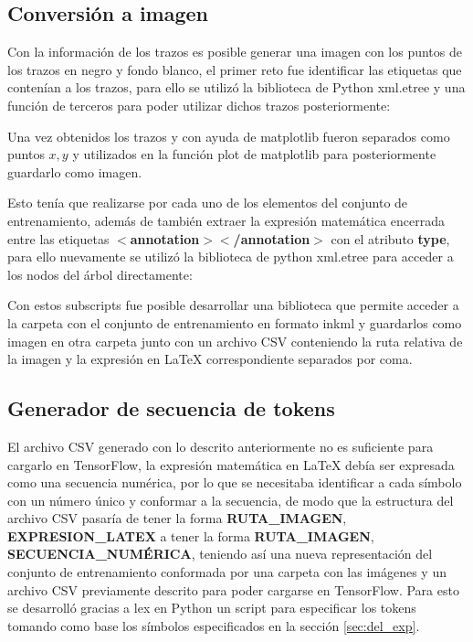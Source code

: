 \subsection{Conversión a imagen}
Con la información de los trazos es posible generar una imagen con los puntos de los trazos en negro y fondo blanco, el primer reto fue identificar las etiquetas que contenían a los trazos, para ello se utilizó la biblioteca de Python xml.etree y una función de terceros para poder utilizar dichos trazos posteriormente:



Una vez obtenidos los trazos y con ayuda de matplotlib fueron separados como puntos $x,y$ y utilizados en la función plot de matplotlib para posteriormente guardarlo como imagen.



Esto tenía que realizarse por cada uno de los elementos del conjunto de entrenamiento, además de también extraer la expresión matemática encerrada entre las etiquetas \textbf{$<$annotation$><$/annotation$>$} con el atributo \textbf{type}, para ello nuevamente se utilizó la biblioteca de python xml.etree para acceder a los nodos del árbol directamente:

Con estos subscripts fue posible desarrollar una biblioteca que permite acceder a la carpeta con el conjunto de entrenamiento en formato inkml y guardarlos como imagen en otra carpeta junto con un archivo CSV conteniendo la ruta relativa de la imagen y la expresión en \LaTeX{} correspondiente separados por coma.


\subsection{Generador de secuencia de tokens}
El archivo CSV generado con lo descrito anteriormente no es suficiente para cargarlo en TensorFlow, la expresión matemática en \LaTeX{} debía ser expresada como una secuencia numérica, por lo que se necesitaba identificar a cada símbolo con un número único y conformar a la secuencia, de modo que la estructura del archivo CSV pasaría de tener la forma \textbf{RUTA\_IMAGEN}, \textbf{EXPRESION\_LATEX} a tener la forma \textbf{RUTA\_IMAGEN}, \textbf{SECUENCIA\_NUMÉRICA}, teniendo así una nueva representación del conjunto de entrenamiento conformada por una carpeta con las imágenes y un archivo CSV previamente descrito para poder cargarse en TensorFlow.
\newpage
Para esto se desarrolló gracias a lex en Python un script para especificar los tokens tomando como base los símbolos especificados en la sección \ref{sec:del_exp}.\\\\


